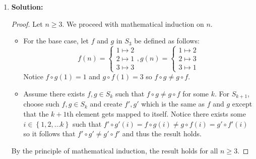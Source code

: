 \documentclass[letterpaper,12pt]{article}
\newcommand{\set}[1]{\left\{ #1 \right\}}
\theoremstyle{definition}
\begin{document}
   \begin{enumerate}
       \item[]
    \begin{mdframed}
            \textbf{Solution:}
            \begin{proof}
            Let $n \geq 3$. We proceed with mathematical induction on $n$. \begin{itemize}
                \item For the base case, let $f$ and $g$ in $S_3$ be defined as follows: $$f(n) = \left \{\begin{matrix}
                    1 \mapsto 2 \\ 2 \mapsto 1 \\ 3 \mapsto 3
                \end{matrix} \right. , g(n) = \left \{\begin{matrix}
                    1 \mapsto 2 \\ 2 \mapsto 3 \\ 3 \mapsto 1
                \end{matrix} \right.$$ Notice $f\circ g(1) = 1$ and $g \circ f(1) = 3$ so $f \circ g \neq g \circ f$.
                \item Assume there exists $f,g \in S_k$ such that $f \circ g \neq g \circ f$ for some $k$. For $S_{k+1}$, choose such $f,g \in S_k$ and create $f',g'$ which is the same as $f$ and $g$ except that the $k+1$th element gets mapped to itself. Notice there exists some $i \in \set{1,2,\ldots k}$ such that $f'\circ g'(i) = f \circ g(i) \neq g \circ f (i)= g' \circ f' (i)$ so it follows that $f' \circ g' \neq g'\circ f'$ and thus the result holds.
            \end{itemize}
              By the principle of mathematical induction, the result holds for all $n \geq 3$.
            \end{proof}
        \end{mdframed}
    \end{enumerate}
\end{document}

